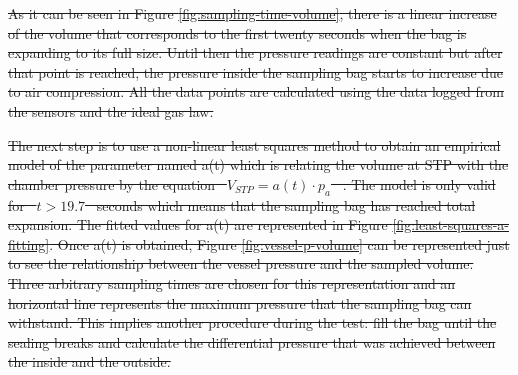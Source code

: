 \documentclass[a4paper,12pt,oneside]{article} %
\providecommand{\DIFdeltex}[1]{{\protect\color{red}\sout{#1}}}                      %
\providecommand{\DIFdelbegin}{} %
\providecommand{\DIFdelend}{} %
\providecommand{\DIFdel}[1]{\texorpdfstring{\DIFdeltex{#1}}{}} %
\newcommand{\DIFscaledelfig}{0.5}
\newlength{\DIFdelgraphicswidth} %
\newlength{\DIFdelgraphicsheight} %
\newcommand{\DIFdelincludegraphics}[2][]{%
\sbox{\DIFdelgraphicsbox}{\DIFOincludegraphics[#1]{#2}}%
\settoboxwidth{\DIFdelgraphicswidth}{\DIFdelgraphicsbox} %
\settoboxtotalheight{\DIFdelgraphicsheight}{\DIFdelgraphicsbox} %
\scalebox{\DIFscaledelfig}{%
\parbox[b]{\DIFdelgraphicswidth}{\usebox{\DIFdelgraphicsbox}\\[-\baselineskip] \rule{\DIFdelgraphicswidth}{0em}}\llap{\resizebox{\DIFdelgraphicswidth}{\DIFdelgraphicsheight}{%
\setlength{\unitlength}{\DIFdelgraphicswidth}%
\begin{picture}(1,1)%
\thicklines\linethickness{2pt} %
{\color[rgb]{1,0,0}\put(0,0){\framebox(1,1){}}}%
{\color[rgb]{1,0,0}\put(0,0){\line( 1,1){1}}}%
{\color[rgb]{1,0,0}\put(0,1){\line(1,-1){1}}}%
\end{picture}%
}\hspace*{3pt}}} %
} %
\DeclareRobustCommand{\DIFdelbegin}{\DIFOdelbegin \let\includegraphics\DIFdelincludegraphics} %
\DeclareRobustCommand{\DIFdelend}{\DIFOaddend \let\includegraphics\DIFOincludegraphics} %
\begin{document}
\begin{appendices}
\DIFdelbegin \DIFdel{As it can be seen in Figure \ref{fig:sampling-time-volume}, there is a linear increase of the volume that corresponds to the first twenty seconds when the bag is expanding to its full size. Until then the pressure readings are constant but after that point is reached, the pressure inside the sampling bag starts to increase due to air compression. All the data points are calculated using the data logged from the sensors and the ideal gas law.
}\DIFdelend %

\DIFdelbegin %
\DIFdel{The next step is to use a non-linear least squares method to obtain an empirical model of the parameter named a(t) which is relating the volume at STP with the chamber pressure by the equation \mbox{%
$V_{STP}=a(t)\cdot p_a$
}%
. The model is only valid for \mbox{%
$t>19.7$
}%
seconds which means that the sampling bag has reached total expansion. The fitted values for a(t) are represented in Figure \ref{fig:least-squares-a-fitting}. Once a(t) is obtained, Figure \ref{fig:vessel-p-volume} can be represented just to see the relationship between the vessel pressure and the sampled volume. Three arbitrary sampling times are chosen for this representation and an horizontal line represents the maximum pressure that the sampling bag can withstand. This implies another procedure during the test: fill the bag until the sealing breaks and calculate the differential pressure that was achieved between the inside and the outside.  
}\DIFdelend %


\end{appendices}
\end{document}
